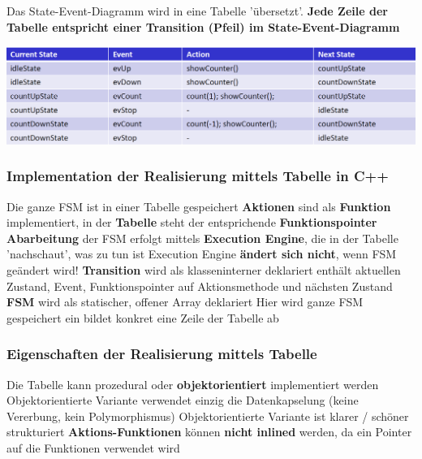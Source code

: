 Das State-Event-Diagramm wird in eine Tabelle 'übersetzt'. \textbf{Jede Zeile der Tabelle entspricht einer Transition (Pfeil) im 
State-Event-Diagramm}

\includegraphics[width=\columnwidth]{images/fsm_tabelle.png}


\columnbreak

\subsubsection{Implementation der Realisierung mittels Tabelle in C++}

\begin{outline}
    \1 Die ganze FSM ist in einer Tabelle gespeichert
    \1 \textbf{Aktionen} sind als \textbf{Funktion} implementiert, in der \textbf{Tabelle} steht der entsprichende \textbf{Funktionspointer} %
    \1 \textbf{Abarbeitung} der FSM erfolgt mittels \textbf{Execution Engine}, die in der Tabelle 'nachschaut', was zu tun ist
        \2 Execution Engine \textbf{ändert sich nicht}, wenn FSM geändert wird!
    \1 \textbf{Transition} wird als klasseninterner  deklariert
        \2 enthält aktuellen Zustand, Event, Funktionspointer auf Aktionsmethode und nächsten Zustand
    \1 \textbf{FSM} wird als statischer, offener Array deklariert
        \2 Hier wird ganze FSM gespeichert
        \2 ein  bildet konkret eine Zeile der Tabelle ab
\end{outline}


\subsubsection{Eigenschaften der Realisierung mittels Tabelle}

\begin{outline}
    \1 Die Tabelle kann prozedural oder \textbf{objektorientiert} implementiert werden
        \2 Objektorientierte Variante verwendet einzig die Datenkapselung (keine Vererbung, kein Polymorphismus)
        \2 Objektorientierte Variante ist klarer / schöner strukturiert
    \1 \textbf{Aktions-Funktionen} können \textbf{nicht inlined} werden, da ein Pointer auf die Funktionen verwendet wird
\end{outline}



